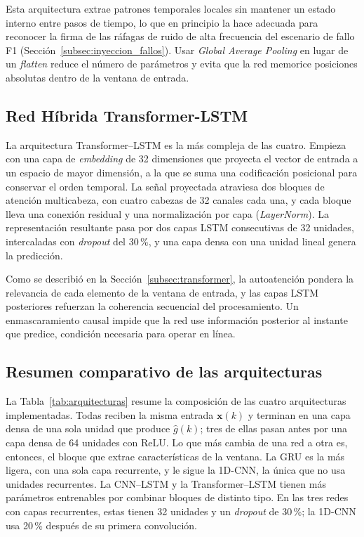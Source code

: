 \documentclass{report}
\begin{document}
Esta arquitectura extrae patrones temporales locales sin mantener un estado interno entre pasos de tiempo, lo que en principio la hace adecuada para reconocer la firma de las ráfagas de ruido de alta frecuencia del escenario de fallo F1 (Sección~\ref{subsec:inyeccion_fallos}). Usar \textit{Global Average Pooling} en lugar de un \textit{flatten} reduce el número de parámetros y evita que la red memorice posiciones absolutas dentro de la ventana de entrada.

\subsection{Red Híbrida Transformer-LSTM}
\label{subsec:arq_transformer_lstm}

La arquitectura Transformer--LSTM es la más compleja de las cuatro. Empieza con una capa de \textit{embedding} de 32 dimensiones que proyecta el vector de entrada a un espacio de mayor dimensión, a la que se suma una codificación posicional para conservar el orden temporal. La señal proyectada atraviesa dos bloques de atención multicabeza, con cuatro cabezas de 32 canales cada una, y cada bloque lleva una conexión residual y una normalización por capa (\textit{LayerNorm}). La representación resultante pasa por dos capas LSTM consecutivas de 32 unidades, intercaladas con \textit{dropout} del 30\,\%, y una capa densa con una unidad lineal genera la predicción.

Como se describió en la Sección~\ref{subsec:transformer}, la autoatención pondera la relevancia de cada elemento de la ventana de entrada, y las capas LSTM posteriores refuerzan la coherencia secuencial del procesamiento. Un enmascaramiento causal impide que la red use información posterior al instante que predice, condición necesaria para operar en línea.

\subsection{Resumen comparativo de las arquitecturas}
\label{subsec:resumen_arquitecturas}

La Tabla~\ref{tab:arquitecturas} resume la composición de las cuatro arquitecturas implementadas. Todas reciben la misma entrada $\mathbf{x}(k)$ y terminan en una capa densa de una sola unidad que produce $\hat{g}(k)$; tres de ellas pasan antes por una capa densa de 64 unidades con ReLU. Lo que más cambia de una red a otra es, entonces, el bloque que extrae características de la ventana. La GRU es la más ligera, con una sola capa recurrente, y le sigue la 1D-CNN, la única que no usa unidades recurrentes. La CNN--LSTM y la Transformer--LSTM tienen más parámetros entrenables por combinar bloques de distinto tipo. En las tres redes con capas recurrentes, estas tienen 32 unidades y un \textit{dropout} de 30\,\%; la 1D-CNN usa 20\,\% después de su primera convolución.
\end{document}
